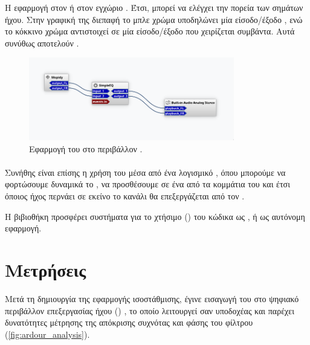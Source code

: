 \documentclass[12pt]{extarticle}
\begin{document}
Η εφαρμογή   στον  
ή στον εγχώριο . Έτσι, μπορεί να ελέγχει την 
πορεία των σημάτων ήχου. Στην γραφική της διεπαφή 
το μπλε χρώμα υποδηλώνει μία είσοδο/έξοδο , ενώ 
το κόκκινο χρώμα αντιστοιχεί σε μία είσοδο/έξοδο 
που χειρίζεται συμβάντα. Αυτά συνύθως αποτελούν .

\begin{figure}[!htb]
    \centering
    \includegraphics[width=0.8\textwidth]{./assets/Carla_Basic.png}
    \caption{Εφαρμογή του  στο περιβάλλον .}
    \label{fig:carla_basic}
\end{figure}


\paragraph{}
Συνήθης είναι επίσης η χρήση του  μέσα από ένα λογισμικό 
, όπου μπορούμε να φορτώσουμε δυναμικά 
το , να προσθέσουμε σε ένα από τα κομμάτια του  
και έτσι όποιος ήχος περνάει σε εκείνο το κανάλι θα επεξεργάζεται από τον . 

Η βιβιοθήκη  προσφέρει συστήματα για το χτήσιμο () του κώδικα 
ως  \cite{VSTWiki}, ή ως αυτόνομη εφαρμογή.  

\section{Μετρήσεις}

Μετά τη δημιουργία της εφαρμογής ισοστάθμισης, έγινε εισαγωγή του  
 στο ψηφιακό περιβάλλον επεξεργασίας ήχου () , 
το οποίο λειτουργεί σαν υποδοχέας και παρέχει δυνατότητες μέτρησης της απόκρισης συχνότας και 
φάσης του φίλτρου (\cref{fig:ardour_analysis}).
\end{document}
